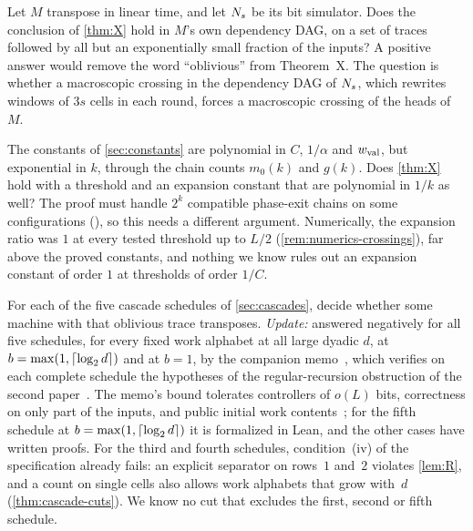 \begin{problem}\label{prob:pullback}
Let $M$ transpose in linear time, and let $N_s$ be its bit simulator. Does the conclusion of \cref{thm:X} hold in $M$'s own dependency
DAG, on a set of traces followed by all but an exponentially small fraction of the inputs? A positive answer would remove the word
``oblivious'' from Theorem~X. The question is whether a macroscopic crossing in the dependency DAG of $N_s$, which rewrites windows of $3s$
cells in each round, forces a macroscopic crossing of the heads of~$M$.
\end{problem}

\begin{problem}\label{prob:constants}
The constants of \cref{sec:constants} are polynomial in $C$, $1/\alpha$ and $w_{\mathrm{val}}$, but exponential in $k$, through the chain counts
$m_0(k)$ and $g(k)$. Does \cref{thm:X} hold with a threshold and an expansion constant that are polynomial in $1/k$ as well? The
proof must handle $2^k$ compatible phase-exit chains on some configurations (),
so this needs a different argument. Numerically, the expansion ratio was $1$ at every tested threshold up to $L/2$
(\cref{rem:numerics-crossings}), far above the proved constants, and nothing we know rules out an expansion constant of order $1$ at
thresholds of order $1/C$.
\end{problem}

\begin{problem}\label{prob:cascades}
For each of the five cascade schedules of \cref{sec:cascades}, decide whether some machine with that oblivious trace transposes.
\emph{Update:} answered negatively for all five schedules, for every fixed work alphabet at all large dyadic $d$, at
$b=\max(1,\lceil \log_2 d \rceil)$ and at $b=1$, by the companion memo~\cite[Theorem~1.1]{CascadeObstructionMemo2026}, which verifies on each
complete schedule the hypotheses of the regular-recursion obstruction of the second paper~\cite[Theorem~7.5]{SecondPaper2026}. The memo's
bound tolerates controllers of $o(L)$ bits, correctness on only part of the inputs, and public initial work
contents~\cite[Proposition~4.3]{CascadeObstructionMemo2026}; for the fifth schedule at $b=\max(1,\lceil \log_2 d \rceil)$ it is formalized in Lean, and the
other cases have written proofs. For the third and fourth schedules, condition~(iv) of the specification already fails: an explicit
separator on rows~$1$ and~$2$ violates \cref{lem:R}, and a count on single cells also allows work alphabets that grow with~$d$
(\cref{thm:cascade-cuts}). We know no cut that excludes the first, second or fifth schedule.
\end{problem}

